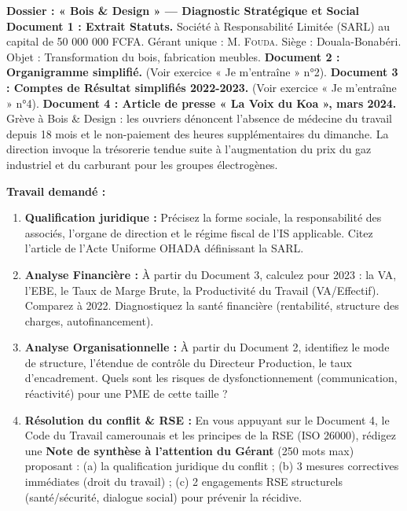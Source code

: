 \documentclass[11pt]{article}
\begin{document}
\begin{exercice}
\textbf{Dossier : « Bois \& Design » — Diagnostic Stratégique et Social}
\textbf{Document 1 : Extrait Statuts.} Société à Responsabilité Limitée (SARL) au capital de 50 000 000 FCFA. Gérant unique : M. \textsc{Fouda}. Siège : Douala-Bonabéri. Objet : Transformation du bois, fabrication meubles.
\textbf{Document 2 : Organigramme simplifié.} (Voir exercice « Je m'entraîne » n°2).
\textbf{Document 3 : Comptes de Résultat simplifiés 2022-2023.} (Voir exercice « Je m'entraîne » n°4).
\textbf{Document 4 : Article de presse « La Voix du Koa », mars 2024.} \og Grève à Bois \& Design : les ouvriers dénoncent l'absence de médecine du travail depuis 18 mois et le non-paiement des heures supplémentaires du dimanche. La direction invoque la trésorerie tendue suite à l'augmentation du prix du gaz industriel et du carburant pour les groupes électrogènes. \fg

\textbf{Travail demandé :}
\begin{enumerate}
    \item \textbf{Qualification juridique :} Précisez la forme sociale, la responsabilité des associés, l'organe de direction et le régime fiscal de l'IS applicable. Citez l'article de l'Acte Uniforme OHADA définissant la SARL.
    \item \textbf{Analyse Financière :} À partir du Document 3, calculez pour 2023 : la VA, l'EBE, le Taux de Marge Brute, la Productivité du Travail (VA/Effectif). Comparez à 2022. Diagnostiquez la santé financière (rentabilité, structure des charges, autofinancement).
    \item \textbf{Analyse Organisationnelle :} À partir du Document 2, identifiez le mode de structure, l'étendue de contrôle du Directeur Production, le taux d'encadrement. Quels sont les risques de dysfonctionnement (communication, réactivité) pour une PME de cette taille ?
    \item \textbf{Résolution du conflit \& RSE :} En vous appuyant sur le Document 4, le Code du Travail camerounais et les principes de la RSE (ISO 26000), rédigez une \textbf{Note de synthèse à l'attention du Gérant} (250 mots max) proposant : (a) la qualification juridique du conflit ; (b) 3 mesures correctives immédiates (droit du travail) ; (c) 2 engagements RSE structurels (santé/sécurité, dialogue social) pour prévenir la récidive.
\end{enumerate}
\end{exercice}
\end{document}

